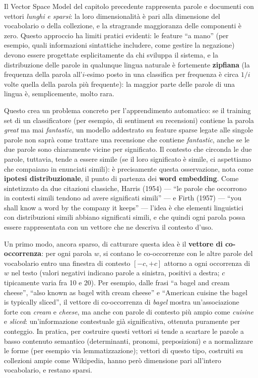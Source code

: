 \documentclass[11pt,a4paper]{report}
\begin{document}
Il Vector Space Model del capitolo precedente rappresenta parole e documenti con vettori \emph{lunghi e sparsi}: la loro dimensionalità è pari alla dimensione del vocabolario o della collezione, e la stragrande maggioranza delle componenti è zero. Questo approccio ha limiti pratici evidenti: le feature ``a mano'' (per esempio, quali informazioni sintattiche includere, come gestire la negazione) devono essere progettate esplicitamente da chi sviluppa il sistema, e la distribuzione delle parole in qualunque lingua naturale è fortemente \textbf{zipfiana} (la frequenza della parola all'$i$-esimo posto in una classifica per frequenza è circa $1/i$ volte quella della parola più frequente): la maggior parte delle parole di una lingua è, semplicemente, molto rara.

Questo crea un problema concreto per l'apprendimento automatico: se il training set di un classificatore (per esempio, di sentiment su recensioni) contiene la parola \emph{great} ma mai \emph{fantastic}, un modello addestrato su feature sparse legate alle singole parole non saprà come trattare una recensione che contiene \emph{fantastic}, anche se le due parole sono chiaramente vicine per significato. Il contesto che circonda le due parole, tuttavia, tende a essere simile (se il loro significato è simile, ci aspettiamo che compaiano in enunciati simili): è precisamente questa osservazione, nota come \textbf{ipotesi distribuzionale}, il punto di partenza dei \textbf{word embedding}. Come sintetizzato da due citazioni classiche, Harris (1954) --- ``le parole che occorrono in contesti simili tendono ad avere significati simili'' --- e Firth (1957) --- ``you shall know a word by the company it keeps'' --- l'idea è che elementi linguistici con distribuzioni simili abbiano significati simili, e che quindi ogni parola possa essere rappresentata con un vettore che ne descriva il contesto d'uso.

Un primo modo, ancora sparso, di catturare questa idea è il \textbf{vettore di co-occorrenza}: per ogni parola $w$, si contano le co-occorrenze con le altre parole del vocabolario entro una finestra di contesto $[-c,+c]$ attorno a ogni occorrenza di $w$ nel testo (valori negativi indicano parole a sinistra, positivi a destra; $c$ tipicamente varia fra 10 e 20). Per esempio, dalle frasi ``a bagel and cream cheese'', ``also known as bagel with cream cheese'' e ``American cuisine the bagel is typically sliced'', il vettore di co-occorrenza di \emph{bagel} mostra un'associazione forte con \emph{cream} e \emph{cheese}, ma anche con parole di contesto più ampio come \emph{cuisine} e \emph{sliced}: un'informazione contestuale già significativa, ottenuta puramente per conteggio. In pratica, per costruire questi vettori si tende a scartare le parole a basso contenuto semantico (determinanti, pronomi, preposizioni) e a normalizzare le forme (per esempio via lemmatizzazione); vettori di questo tipo, costruiti su collezioni ampie come Wikipedia, hanno però dimensione pari all'intero vocabolario, e restano sparsi.
\end{document}
